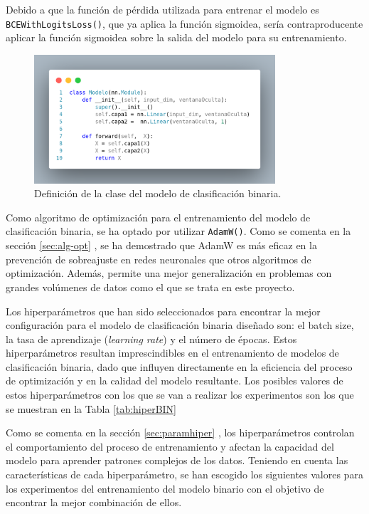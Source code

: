Debido a que la función de pérdida utilizada para entrenar el modelo es \texttt{BCEWithLogitsLoss()}, que ya aplica la función sigmoidea, sería contraproducente aplicar la función sigmoidea sobre la salida del modelo para su entrenamiento.

\begin{figure}[H]
    \centering
    \includegraphics[width=0.8\textwidth]{./img/modelo/codigo/modeloBIN.png}
    \caption{Definición de la clase del modelo de clasificación binaria.}
    \label{fig:modBIN}
\end{figure}

Como algoritmo de optimización para el entrenamiento del modelo de clasificación binaria, se ha optado por utilizar \texttt{AdamW()}. Como se comenta en la sección \ref{sec:alg-opt} , se ha demostrado que AdamW es más eficaz en la prevención de sobreajuste en redes neuronales que otros algoritmos de optimización. Además, permite una mejor generalización en problemas con grandes volúmenes de datos como el que se trata en este proyecto.

Los hiperparámetros que han sido seleccionados para encontrar la mejor configuración para el modelo de clasificación binaria diseñado son: el batch size, la tasa de aprendizaje (\textit{learning rate}) y el número de épocas. Estos hiperparámetros resultan imprescindibles en el entrenamiento de modelos de clasificación binaria, dado que influyen directamente en la eficiencia del proceso de optimización y en la calidad del modelo resultante. Los posibles valores de estos hiperparámetros con los que se van a realizar los experimentos son los que se muestran en la Tabla \ref{tab:hiperBIN}

Como se comenta en la sección \ref{sec:paramhiper} , los hiperparámetros controlan el comportamiento del proceso de entrenamiento y afectan la capacidad del modelo para aprender patrones complejos de los datos. Teniendo en cuenta las características de cada hiperparámetro, se han escogido los siguientes valores para los experimentos del entrenamiento del modelo binario con el objetivo de encontrar la mejor combinación de ellos.

